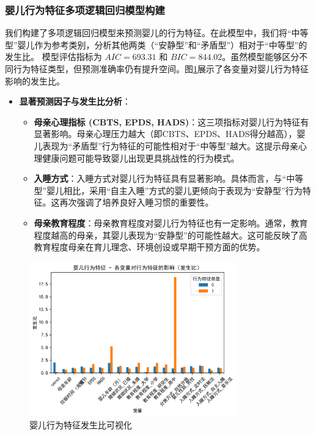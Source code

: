\documentclass[withoutpreface,bwprint]{cumcmthesis}
\begin{document}
\subsubsection{婴儿行为特征多项逻辑回归模型构建}
我们构建了多项逻辑回归模型来预测婴儿的行为特征。在此模型中，我们将“中等型”婴儿作为参考类别，分析其他两类（“安静型”和“矛盾型”）相对于“中等型”的发生比。
模型评估指标为 $AIC = 693.31$ 和 $BIC = 844.02$。虽然模型能够区分不同行为特征类型，但预测准确率仍有提升空间。图\ref{fig:baby_behavior_odds_ratios}展示了各变量对婴儿行为特征影响的发生比。
\begin{itemize}
    \item \textbf{显著预测因子与发生比分析}：
    \begin{itemize}
        \item \textbf{母亲心理指标 (CBTS, EPDS, HADS)}：这三项指标对婴儿行为特征有显著影响。母亲心理压力越大（即CBTS、EPDS、HADS得分越高），婴儿表现为“矛盾型”行为特征的可能性相对于“中等型”越大。这提示母亲心理健康问题可能导致婴儿出现更具挑战性的行为模式。
        \item \textbf{入睡方式}：入睡方式对婴儿行为特征具有显著影响。具体而言，与“中等型”婴儿相比，采用“自主入睡”方式的婴儿更倾向于表现为“安静型”行为特征。这再次强调了培养良好入睡习惯的重要性。
        \item \textbf{母亲教育程度}：母亲教育程度对婴儿行为特征也有一定影响。通常，教育程度越高的母亲，其婴儿表现为“安静型”的可能性越大。这可能反映了高教育程度母亲在育儿理念、环境创设或早期干预方面的优势。
    \end{itemize}
\end{itemize}

\begin{figure}[htbp]
    \centering
    \includegraphics[width=0.8\textwidth]{figures/婴儿行为特征_odds_ratios.png} %
    \caption{婴儿行为特征发生比可视化}
    \label{fig:baby_behavior_odds_ratios}
\end{figure}
\end{document}
